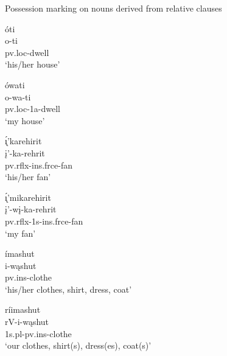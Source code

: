 \begin{exe}
    \item\label{Ch5PossessionRel} Possession marking on nouns derived from relative clauses

    \begin{xlist}
        \item\label{Ch5PossessionRelA} \glll óti\\
        o-ti\\
        pv.loc-\textnormal{dwell}\\
        \glt `his/her house' \citep[251]{hollow1970}

        \item\label{Ch5PossessionRelB} \glll ówati\\
        o-wa-ti\\
        pv.loc-1a-\textnormal{dwell}\\
        \glt `my house' \citep[251]{hollow1970}

        \item\label{Ch5PossessionRelC} \glll \'{ı̨}'karehirit\\
        į'-ka-rehrit\\
        pv.rflx-ins.frce-\textnormal{fan}\\
        \glt `his/her fan' \citep[87]{hollow1970}

        \item\label{Ch5PossessionRelD} \glll \'{ı̨}'mikarehirit\\
        į'-wį-ka-rehrit\\
        pv.rflx-1s-ins.frce-\textnormal{fan}\\
        \glt `my fan' \citep[87]{hollow1970}

        \item\label{Ch5PossessionRelE} \glll ímashut\\
        i-wąshut\\
        pv.ins-\textnormal{clothe}\\
        \glt `his/her clothes, shirt, dress, coat' \citep[97]{hollow1970}

        \item\label{Ch5PossessionRelF} \glll ríimashut\\
        rV-i-wąshut\\
        1s.pl-pv.ins-\textnormal{clothe}\\
        \glt `our clothes, shirt(s), dress(es), coat(s)' \citep[97]{hollow1970}
    \end{xlist}
\end{exe}

